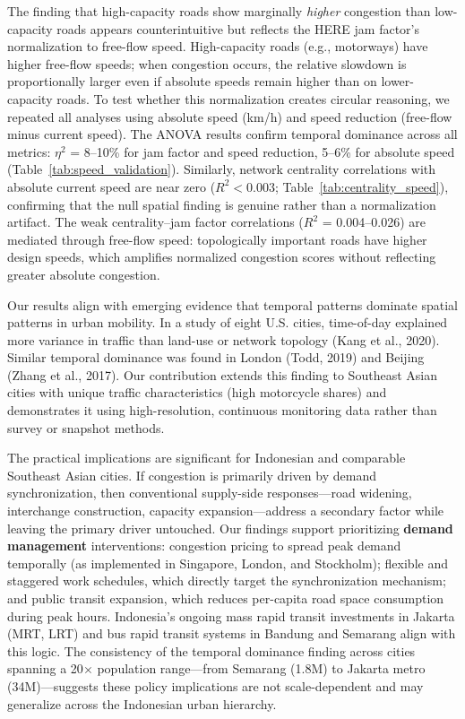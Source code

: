 \documentclass[12pt,a4paper]{article}
\begin{document}
The finding that high-capacity roads show marginally \textit{higher} congestion than low-capacity roads appears counterintuitive but reflects the HERE jam factor's normalization to free-flow speed. High-capacity roads (e.g., motorways) have higher free-flow speeds; when congestion occurs, the relative slowdown is proportionally larger even if absolute speeds remain higher than on lower-capacity roads. To test whether this normalization creates circular reasoning, we repeated all analyses using absolute speed (km/h) and speed reduction (free-flow minus current speed). The ANOVA results confirm temporal dominance across all metrics: $\eta^2$ = 8--10\% for jam factor and speed reduction, 5--6\% for absolute speed (Table~\ref{tab:speed_validation}). Similarly, network centrality correlations with absolute current speed are near zero ($R^2 < 0.003$; Table~\ref{tab:centrality_speed}), confirming that the null spatial finding is genuine rather than a normalization artifact. The weak centrality--jam factor correlations ($R^2$ = 0.004--0.026) are mediated through free-flow speed: topologically important roads have higher design speeds, which amplifies normalized congestion scores without reflecting greater absolute congestion.

Our results align with emerging evidence that temporal patterns dominate spatial patterns in urban mobility. In a study of eight U.S. cities, time-of-day explained more variance in traffic than land-use or network topology (Kang et al., 2020). Similar temporal dominance was found in London (Todd, 2019) and Beijing (Zhang et al., 2017). Our contribution extends this finding to Southeast Asian cities with unique traffic characteristics (high motorcycle shares) and demonstrates it using high-resolution, continuous monitoring data rather than survey or snapshot methods.

The practical implications are significant for Indonesian and comparable Southeast Asian cities. If congestion is primarily driven by demand synchronization, then conventional supply-side responses---road widening, interchange construction, capacity expansion---address a secondary factor while leaving the primary driver untouched. Our findings support prioritizing \textbf{demand management} interventions: congestion pricing to spread peak demand temporally (as implemented in Singapore, London, and Stockholm); flexible and staggered work schedules, which directly target the synchronization mechanism; and public transit expansion, which reduces per-capita road space consumption during peak hours. Indonesia's ongoing mass rapid transit investments in Jakarta (MRT, LRT) and bus rapid transit systems in Bandung and Semarang align with this logic. The consistency of the temporal dominance finding across cities spanning a 20$\times$ population range---from Semarang (1.8M) to Jakarta metro (34M)---suggests these policy implications are not scale-dependent and may generalize across the Indonesian urban hierarchy.
\end{document}
